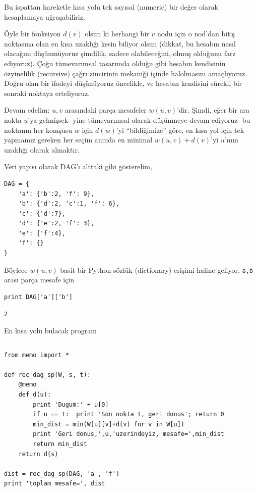 \documentclass[12pt,fleqn]{article}\usepackage{../../common}
\begin{document}
Bu ispattan hareketle kısa yolu tek sayısal (numeric) bir değer olarak
hesaplamaya uğraşabiliriz.

Öyle bir fonksiyon $d(v)$ olsun ki herhangi bir $v$ nodu için o nod'dan
bitiş noktasına olan en kısa uzaklığı kesin biliyor olsun (dikkat, bu
hesabın nasıl olacağını düşünmüyoruz şimdilik, sadece olabileceğini, olmuş
olduğunu farz ediyoruz). Çoğu tümevarımsal tasarımda olduğu gibi hesabın
kendisinin özyinelilik (recursive) çağrı zincirinin mekaniği içinde
halolmasını amaçlıyoruz. Doğru olan bir ifadeyi düşünüyoruz öncelikle, ve
hesabın kendisini sürekli bir sonraki noktaya erteliyoruz. 

Devam edelim: $u,v$ arasındaki parça mesafeler $w(u,v)$'dir. Şimdi, eğer
bir ara nokta $u$'ya gelmişsek -yine tümevarımsal olarak düşünmeye devam
ediyoruz- bu noktanın her komşusu $w$ için $d(w)$'yi ``bildiğimize'' göre,
en kısa yol için tek yapmamız gereken her seçim anında en minimal $w(u,v) +
d(v)$'yi  $u$'nun uzaklığı olarak almaktır.

Veri yapısı olarak DAG'ı alttaki gibi gösterelim,

\begin{verbatim}
DAG = {
    'a': {'b':2, 'f': 9},
    'b': {'d':2, 'c':1, 'f': 6},
    'c': {'d':7},
    'd': {'e':2, 'f': 3},
    'e': {'f':4},
    'f': {}
}
\end{verbatim}

Böylece $w(u,v)$ basit bir Python sözlük (dictionary) erişimi haline
geliyor, \verb!a,b! arası parça mesafe için 

\begin{verbatim}
print DAG['a']['b']
\end{verbatim}

\begin{verbatim}
2
\end{verbatim}

En kısa yolu bulacak program

\inputminted[fontsize=\footnotesize]{python}{memo.py}

\begin{verbatim}
from memo import *

def rec_dag_sp(W, s, t): 
    @memo                                    
    def d(u):
        print 'Dugum:' + u[0]
        if u == t:  print 'Son nokta t, geri donus'; return 0  
        min_dist = min(W[u][v]+d(v) for v in W[u])  
        print 'Geri donus,',u,'uzerindeyiz, mesafe=',min_dist
        return min_dist
    return d(s)                                 

dist = rec_dag_sp(DAG, 'a', 'f')
print 'toplam mesafe=', dist
\end{verbatim}
\end{document}
